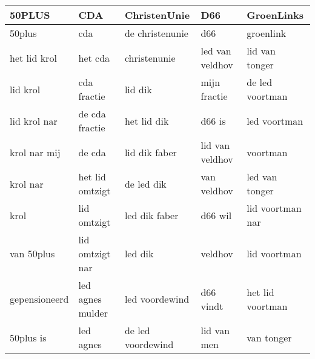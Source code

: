 \begin{tabular}{lllll}
\toprule
        50PLUS &               CDA &       ChristenUnie &              D66 &        GroenLinks \\
\midrule
        50plus &               cda &    de christenunie &              d66 &         groenlink \\
  het lid krol &           het cda &       christenunie &  led van veldhov &    lid van tonger \\
      lid krol &       cda fractie &            lid dik &     mijn fractie &   de led voortman \\
  lid krol nar &    de cda fractie &        het lid dik &           d66 is &      led voortman \\
  krol nar mij &            de cda &      lid dik faber &  lid van veldhov &          voortman \\
      krol nar &   het lid omtzigt &         de led dik &      van veldhov &    led van tonger \\
          krol &       lid omtzigt &      led dik faber &          d66 wil &  lid voortman nar \\
    van 50plus &   lid omtzigt nar &            led dik &          veldhov &      lid voortman \\
 gepensioneerd &  led agnes mulder &     led voordewind &        d66 vindt &  het lid voortman \\
     50plus is &         led agnes &  de led voordewind &      lid van men &        van tonger \\
\bottomrule
\end{tabular}
